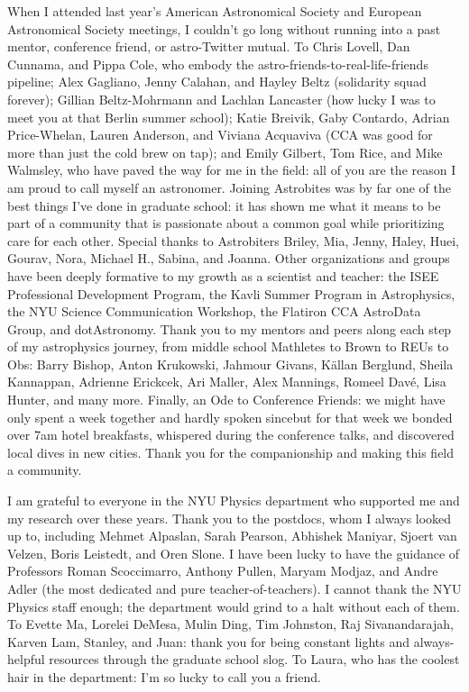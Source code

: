 When I attended last year's American Astronomical Society and European Astronomical Society meetings, I couldn't go long without running into a past mentor, conference friend, or astro-Twitter mutual.
To Chris Lovell, Dan Cunnama, and Pippa Cole, who embody the astro-friends-to-real-life-friends pipeline; Alex Gagliano, Jenny Calahan, and Hayley Beltz (solidarity squad forever); Gillian Beltz-Mohrmann and Lachlan Lancaster (how lucky I was to meet you at that Berlin summer school); Katie Breivik, Gaby Contardo, Adrian Price-Whelan, Lauren Anderson, and Viviana Acquaviva (CCA was good for more than just the cold brew on tap); and Emily Gilbert, Tom Rice, and Mike Walmsley, who have paved the way for me in the field: all of you are the reason I am proud to call myself an astronomer.
Joining Astrobites was by far one of the best things I've done in graduate school: it has shown me what it means to be part of a community that is passionate about a common goal while prioritizing care for each other. Special thanks to Astrobiters Briley, Mia, Jenny, Haley, Huei, Gourav, Nora, Michael H., Sabina, and Joanna.
Other organizations and groups have been deeply formative to my growth as a scientist and teacher: the ISEE Professional Development Program, the Kavli Summer Program in Astrophysics, the NYU Science Communication Workshop, the Flatiron CCA AstroData Group, and dotAstronomy. 
Thank you to my mentors and peers along each step of my astrophysics journey, from middle school Mathletes to Brown to REUs to Obs: Barry Bishop, Anton Krukowski, Jahmour Givans, K\"allan Berglund, Sheila Kannappan, Adrienne Erickcek,  Ari Maller, Alex Mannings, Romeel Dav\'e, Lisa Hunter, and many more.
Finally, an Ode to Conference Friends: we might have only spent a week together and hardly spoken since{\emdash}but for that week we bonded over 7am hotel breakfasts, whispered during the conference talks, and discovered local dives in new cities.
Thank you for the companionship and making this field a community.


I am grateful to everyone in the NYU Physics department who supported me and my research over these years.
Thank you to the postdocs, whom I always looked up to, including Mehmet Alpaslan, Sarah Pearson, Abhishek Maniyar, Sjoert van Velzen, Boris Leistedt, and Oren Slone.
I have been lucky to have the guidance of Professors Roman Scoccimarro, Anthony Pullen, Maryam Modjaz, and Andre Adler (the most dedicated and pure teacher-of-teachers).
I cannot thank the NYU Physics staff enough; the department would grind to a halt without each of them.
To Evette Ma, Lorelei DeMesa, Mulin Ding, Tim Johnston, Raj Sivanandarajah, Karven Lam, Stanley, and Juan: thank you for being constant lights and always-helpful resources through the graduate school slog.
To Laura, who has the coolest hair in the department: I'm so lucky to call you a friend.

